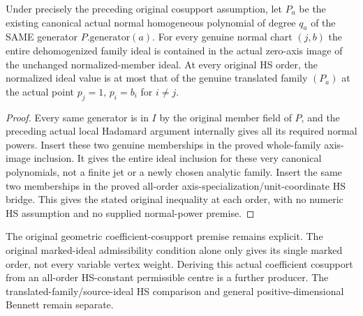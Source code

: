 \begin{theorem}
\label{hir:actual-vertex-coefficient-cosupport-axis-translated-hs}
Under precisely the preceding original cosupport assumption, let
$P_a$ be the existing canonical actual normal homogeneous polynomial
of degree $q_a$ of the SAME generator $P.\mathrm{generator}(a)$.
For every genuine normal chart $(j,b)$ the entire dehomogenized family
ideal is contained in the actual zero-axis image of the unchanged
normalized-member ideal. At every original HS order, the normalized
ideal value is at most that of the genuine translated family $(P_a)$
at the actual point $p_j=1$, $p_i=b_i$ for $i\ne j$.
\leanok
\end{theorem}
\begin{proof}
Every same generator is in $I$ by the original member field of $P$,
and the preceding actual local Hadamard argument internally gives all
its required normal powers. Insert these two genuine memberships in
the proved whole-family axis-image inclusion. It gives the entire
ideal inclusion for these very canonical polynomials, not a finite
jet or a newly chosen analytic family. Insert the same two memberships
in the proved all-order axis-specialization/unit-coordinate HS bridge.
This gives the stated original inequality at each order, with no
numeric HS assumption and no supplied normal-power premise.
\end{proof}

The original geometric coefficient-cosupport premise remains explicit.
The original marked-ideal admissibility condition alone only gives its
single marked order, not every variable vertex weight. Deriving this
actual coefficient cosupport from an all-order HS-constant permissible
centre is a further producer. The translated-family/source-ideal HS
comparison and general positive-dimensional Bennett remain separate.
